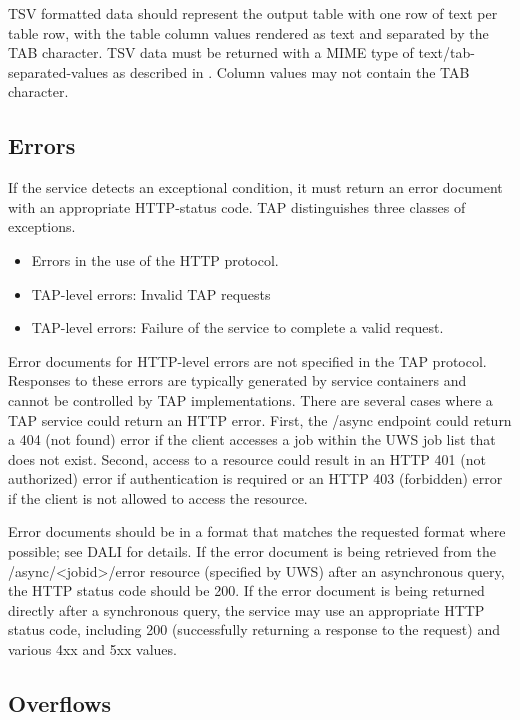 \documentclass[11pt,letter]{ivoa}
\begin{document}
TSV formatted data should represent the output table with one row of text per 
table row, with the table column values rendered as text and separated by the 
TAB character. TSV data must be returned with a MIME type of 
text/tab-separated-values as described in
\citet{std:TSV}. Column values may not contain the 
TAB 
character.

\subsection{Errors}
\label{sec:query-error}

If the service detects an exceptional condition, it must return an error 
document with an appropriate HTTP-status code. TAP distinguishes three classes 
of exceptions.

\begin{itemize}
\item Errors in the use of the HTTP protocol. 

\item TAP-level errors: Invalid TAP requests

\item TAP-level errors: Failure of the service to complete a valid request.
\end{itemize}

Error documents for HTTP-level errors are not specified in the TAP protocol. 
Responses to these errors are typically generated by service containers and 
cannot be controlled by TAP implementations. There are several cases where a 
TAP 
service could return an HTTP error. First, the /async endpoint could return a 
404 (not found) error if the client accesses a job within the UWS job list that 
does not exist. Second, access to a resource could result in an HTTP 401 (not 
authorized) error if authentication is required or an HTTP 403 (forbidden) 
error if the client is not allowed to access the resource.

Error documents should be in a format that matches the requested
format where possible; see DALI for details. 
If the error document is being retrieved 
from the /async/<jobid>/error resource (specified by UWS) after an asynchronous 
query, the HTTP status code should be 200. If the error document is being 
returned directly after a synchronous query, the service may use an appropriate 
HTTP status code, including 200 (successfully returning a response to the 
request) and various 4xx and 5xx values.

\subsection{Overflows}
\label{sec:query-overflow}
\end{document}
